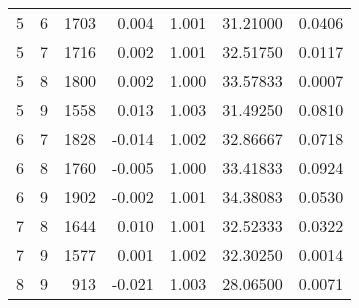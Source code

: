 \begin{longtable}{rrrrrrr}
5 & 6 & 1703 & 0.004 & 1.001 & 31.21000 & 0.0406 \\ 
5 & 7 & 1716 & 0.002 & 1.001 & 32.51750 & 0.0117 \\ 
5 & 8 & 1800 & 0.002 & 1.000 & 33.57833 & 0.0007 \\ 
5 & 9 & 1558 & 0.013 & 1.003 & 31.49250 & 0.0810 \\ 
6 & 7 & 1828 & -0.014 & 1.002 & 32.86667 & 0.0718 \\ 
6 & 8 & 1760 & -0.005 & 1.000 & 33.41833 & 0.0924 \\ 
6 & 9 & 1902 & -0.002 & 1.001 & 34.38083 & 0.0530 \\ 
7 & 8 & 1644 & 0.010 & 1.001 & 32.52333 & 0.0322 \\ 
7 & 9 & 1577 & 0.001 & 1.002 & 32.30250 & 0.0014 \\ 
8 & 9 & 913 & -0.021 & 1.003 & 28.06500 & 0.0071 \\ 
\bottomrule
\end{longtable}


